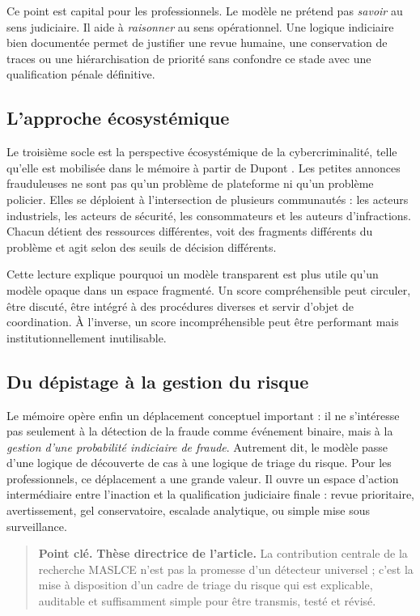 \documentclass[10pt,a4paper]{article}
\newcommand{\callout}[1]{%
  \begin{quote}\small\textbf{Point clé.} #1\end{quote}}
\begin{document}
Ce point est capital pour les professionnels. Le modèle ne prétend pas \emph{savoir} au sens judiciaire. Il aide à \emph{raisonner} au sens opérationnel. Une logique indiciaire bien documentée permet de justifier une revue humaine, une conservation de traces ou une hiérarchisation de priorité sans confondre ce stade avec une qualification pénale définitive.

\subsection{L'approche écosystémique}
Le troisième socle est la perspective écosystémique de la cybercriminalité, telle qu'elle est mobilisée dans le mémoire à partir de Dupont \cite{dupont2024}. Les petites annonces frauduleuses ne sont pas qu'un problème de plateforme ni qu'un problème policier. Elles se déploient à l'intersection de plusieurs communautés : les acteurs industriels, les acteurs de sécurité, les consommateurs et les auteurs d'infractions. Chacun détient des ressources différentes, voit des fragments différents du problème et agit selon des seuils de décision différents.

Cette lecture explique pourquoi un modèle transparent est plus utile qu'un modèle opaque dans un espace fragmenté. Un score compréhensible peut circuler, être discuté, être intégré à des procédures diverses et servir d'objet de coordination. À l'inverse, un score incompréhensible peut être performant mais institutionnellement inutilisable.

\subsection{Du dépistage à la gestion du risque}
Le mémoire opère enfin un déplacement conceptuel important : il ne s'intéresse pas seulement à la détection de la fraude comme événement binaire, mais à la \emph{gestion d'une probabilité indiciaire de fraude}. Autrement dit, le modèle passe d'une logique de découverte de cas à une logique de triage du risque. Pour les professionnels, ce déplacement a une grande valeur. Il ouvre un espace d'action intermédiaire entre l'inaction et la qualification judiciaire finale : revue prioritaire, avertissement, gel conservatoire, escalade analytique, ou simple mise sous surveillance.

\callout{\textbf{Thèse directrice de l'article.} La contribution centrale de la recherche MASLCE n'est pas la promesse d'un détecteur universel ; c'est la mise à disposition d'un cadre de triage du risque qui est explicable, auditable et suffisamment simple pour être transmis, testé et révisé.}
\end{document}
